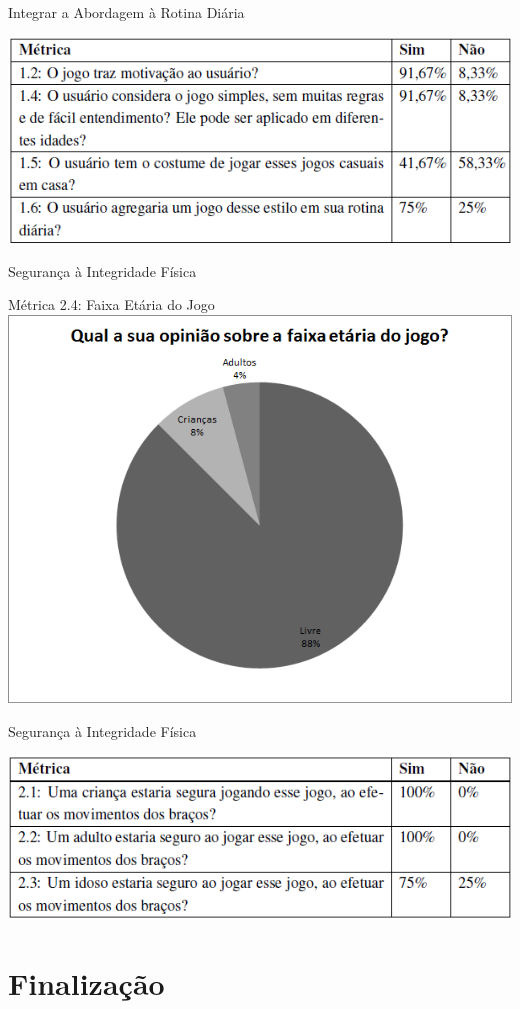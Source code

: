 \documentclass{beamer}
\begin{document}
\begin{frame}{Integrar a Abordagem à Rotina Diária} 
    \begin{block}{}
			\center \includegraphics[height=1.4 in]{img/metricasq1.png}
    \end{block}
\end{frame}

\begin{frame}{Segurança à Integridade Física} 
    \begin{block}{Métrica 2.4: Faixa Etária do Jogo}
			\center \includegraphics[height=2.6 in]{img/chart_10-.png}
    \end{block}
\end{frame}

\begin{frame}{Segurança à Integridade Física} 
    \begin{block}{}
			\center \includegraphics[height=1.4 in]{img/metricasq2.png}
    \end{block}
\end{frame}


\section{Finalização}
\end{document}
